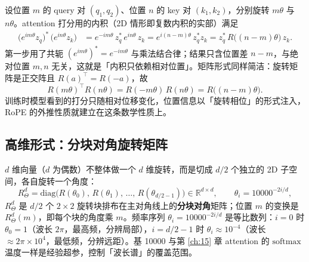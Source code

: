 设位置 $m$ 的 query 对 $(q_1,q_2)$、位置 $n$ 的 key 对 $(k_1,k_2)$，分别旋转 $m\theta$ 与 $n\theta$。attention 打分用的内积（2D 情形即复数内积的实部）满足
\begin{align}
  \big(e^{im\theta} z_q\big)^{*}\,\big(e^{in\theta} z_k\big)
  &= e^{-im\theta}\, z_q^{*}\, e^{in\theta}\, z_k
   = e^{i(n-m)\theta}\, z_q^{*} z_k
   = z_q^{*}\, R\big((n-m)\theta\big)\, z_k .
  \label{eq:ch07-relative}
\end{align}
第一步用了共轭 $ (e^{im\theta})^{*} = e^{-im\theta}$ 与乘法结合律；结果只含位置差 $n - m$，与绝对位置 $m, n$ 无关，这就是「内积只依赖相对位置」。矩阵形式同样简洁：旋转矩阵是正交阵且 $R(a)^{\top} = R(-a)$，故
\begin{equation}
  R(m\theta)^{\top} R(n\theta) = R(-m\theta)\,R(n\theta) = R\big((n-m)\theta\big).
\end{equation}
训练时模型看到的打分只随相对位移变化，位置信息以「旋转相位」的形式注入，RoPE 的外推性质就建立在这条数学性质上。

\subsection{高维形式：分块对角旋转矩阵}

$d$ 维向量（$d$ 为偶数）不整体做一个 $d$ 维旋转，而是切成 $d/2$ 个独立的 2D 子空间，各自旋转一个角度：
\begin{equation}
  R^{d}_{\Theta}
  = \mathrm{diag}\big(R(\theta_0),\, R(\theta_1),\, \dots,\, R(\theta_{d/2-1})\big)
  \in \mathbb{R}^{d \times d},
  \qquad
  \theta_i = 10000^{-2i/d},
  \label{eq:ch07-blockdiag}
\end{equation}
$R^{d}_{\Theta}$ 是 $d/2$ 个 $2\times 2$ 旋转块排布在主对角线上的\textbf{分块对角}矩阵；位置 $m$ 的变换是 $R^{d}_{\Theta}(m)$，即每个块的角度乘 $m$。频率序列 $\theta_i = 10000^{-2i/d}$ 是等比数列：$i = 0$ 时 $\theta_0 = 1$（波长 $2\pi$，最高频，分辨局部），$i = d/2 - 1$ 时 $\theta_i \approx 10^{-4}$（波长 $\approx 2\pi \times 10^4$，最低频，分辨远距）。基 10000 与第 \ref{ch:15} 章 attention 的 $\mathrm{softmax}$ 温度一样是经验超参，控制「波长谱」的覆盖范围。

